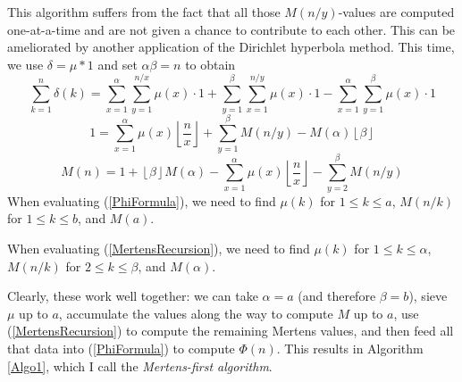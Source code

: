 \documentclass[12pt]{article}
\newcommand{\eqn}[1]{\begin{displaymath} #1 \end{displaymath}}
\newcommand{\neqn}[1]{\begin{equation} #1 \end{equation}}
\newcommand{\floor}[1]{{\left\lfloor #1 \right\rfloor}}
\newcommand{\floordiv}[2]{\floor{\frac{#1}{#2}}}
\begin{document}
This algorithm suffers from the fact that all those $M(n/y)$-values are computed one-at-a-time and are not given a chance to contribute to each other.  This can be ameliorated by another application of the Dirichlet hyperbola method.  This time, we use $\delta = \mu * 1$ and set $\alpha\beta=n$ to obtain
\eqn{\sum_{k=1}^n \delta(k) = \sum_{x=1}^{\alpha}\sum_{y=1}^{n/x} \mu(x) \cdot 1 + \sum_{y=1}^{\beta}\sum_{x=1}^{n/y} \mu(x) \cdot 1 - \sum_{x=1}^{\alpha}\sum_{y=1}^{\beta} \mu(x) \cdot 1}
\eqn{1 = \sum_{x=1}^{\alpha} \mu(x) \floordiv{n}{x} + \sum_{y=1}^{\beta} M(n/y) - M(\alpha) \floor{\beta}}
\neqn{M(n) = 1 + \floor{\beta} M(\alpha) - \sum_{x=1}^{\alpha} \mu(x) \floordiv{n}{x} - \sum_{y=2}^{\beta} M(n/y) \label{MertensRecursion}}
When evaluating (\ref{PhiFormula}), we need to find $\mu(k)$ for $1 \leq k \leq a$, $M(n/k)$ for $1 \leq k \leq b$, and $M(a)$.

When evaluating (\ref{MertensRecursion}), we need to find $\mu(k)$ for $1 \leq k \leq \alpha$, $M(n/k)$ for $2 \leq k \leq \beta$, and $M(\alpha)$.

Clearly, these work well together: we can take $\alpha=a$ (and therefore $\beta=b$), sieve $\mu$ up to $a$, accumulate the values along the way to compute $M$ up to $a$, use (\ref{MertensRecursion}) to compute the remaining Mertens values, and then feed all that data into (\ref{PhiFormula}) to compute $\Phi(n)$.  This results in Algorithm \ref{Algo1}, which I call the \emph{Mertens-first algorithm}.
\end{document}
